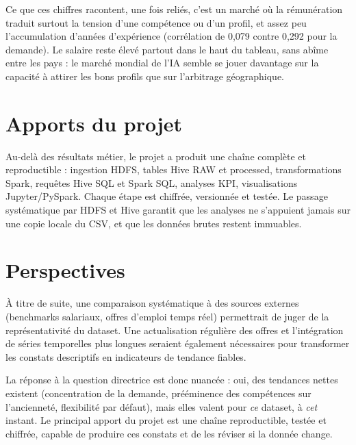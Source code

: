 Ce que ces chiffres racontent, une fois reliés, c'est un marché où la
rémunération traduit surtout la tension d'une compétence ou d'un profil,
et assez peu l'accumulation d'années d'expérience (corrélation de 0,079
contre 0,292 pour la demande). Le salaire reste élevé partout dans le
haut du tableau, sans abîme entre les pays : le marché mondial de l'IA
semble se jouer davantage sur la capacité à attirer les bons profils que
sur l'arbitrage géographique.

\section{Apports du projet}

Au-delà des résultats métier, le projet a produit une chaîne complète et
reproductible : ingestion HDFS, tables Hive RAW et processed,
transformations Spark, requêtes Hive SQL et Spark SQL, analyses KPI,
visualisations Jupyter/PySpark. Chaque étape est chiffrée, versionnée et
testée. Le passage systématique par HDFS et Hive garantit que les
analyses ne s'appuient jamais sur une copie locale du CSV, et que les
données brutes restent immuables.

\section{Perspectives}

À titre de suite, une comparaison systématique à des sources externes
(benchmarks salariaux, offres d'emploi temps réel) permettrait de juger
de la représentativité du dataset. Une actualisation régulière des
offres et l'intégration de séries temporelles plus longues seraient
également nécessaires pour transformer les constats descriptifs en
indicateurs de tendance fiables.

La réponse à la question directrice est donc nuancée : oui, des
tendances nettes existent (concentration de la demande, prééminence des
compétences sur l'ancienneté, flexibilité par défaut), mais elles valent
pour \emph{ce} dataset, à \emph{cet} instant. Le principal apport du
projet est une chaîne reproductible, testée et chiffrée, capable de
produire ces constats et de les réviser si la donnée change.
